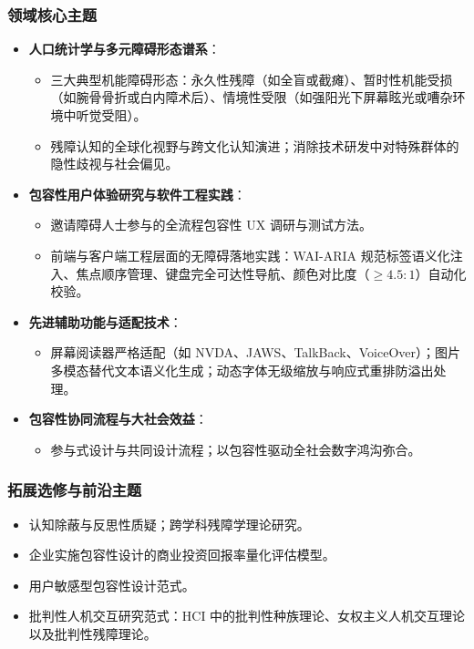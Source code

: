 \subsubsection{领域核心主题}
\begin{itemize}
    \item \textbf{人口统计学与多元障碍形态谱系}：
    \begin{itemize}
        \item 三大典型机能障碍形态：永久性残障（如全盲或截瘫）、暂时性机能受损（如腕骨骨折或白内障术后）、情境性受限（如强阳光下屏幕眩光或嘈杂环境中听觉受阻）。
        \item 残障认知的全球化视野与跨文化认知演进；消除技术研发中对特殊群体的隐性歧视与社会偏见。
    \end{itemize}
    \item \textbf{包容性用户体验研究与软件工程实践}：
    \begin{itemize}
        \item 邀请障碍人士参与的全流程包容性 UX 调研与测试方法。
        \item 前端与客户端工程层面的无障碍落地实践：WAI-ARIA 规范标签语义化注入、焦点顺序管理、键盘完全可达性导航、颜色对比度（$\ge 4.5:1$）自动化校验。
    \end{itemize}
    \item \textbf{先进辅助功能与适配技术}：
    \begin{itemize}
        \item 屏幕阅读器严格适配（如 NVDA、JAWS、TalkBack、VoiceOver）；图片多模态替代文本语义化生成；动态字体无级缩放与响应式重排防溢出处理。
    \end{itemize}
    \item \textbf{包容性协同流程与大社会效益}：
    \begin{itemize}
        \item 参与式设计与共同设计流程；以包容性驱动全社会数字鸿沟弥合。
    \end{itemize}
\end{itemize}

\subsubsection{拓展选修与前沿主题}
\begin{itemize}
    \item 认知除蔽与反思性质疑；跨学科残障学理论研究。
    \item 企业实施包容性设计的商业投资回报率量化评估模型。
    \item 用户敏感型包容性设计范式。
    \item 批判性人机交互研究范式：HCI 中的批判性种族理论、女权主义人机交互理论以及批判性残障理论。
\end{itemize}

